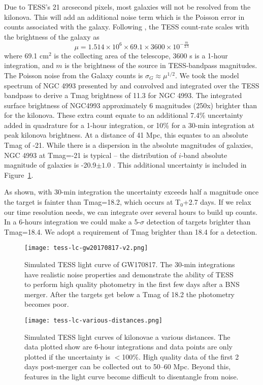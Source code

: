 \documentclass[modern]{aastex61}
\begin{document}
Due to TESS's 21 arcsecond pixels, most galaxies will not be resolved from the kilonova. This will add an additional noise term which is the Poisson error in counts associated with the galaxy. Following \citet{Bouma2017}, the TESS count-rate scales with the brightness of the galaxy as
\begin{equation}
\mu = 1.514\times10^6 \times 69.1 \times 3600 \times 10^{- \frac{m}{2.5}}
\end{equation}
where 69.1 cm$^2$ is the collecting area of the telescope, 3600 s is a 1-hour integration, and $m$ is the brightness of the source in TESS-bandpass magnitudes. The Poisson noise from the Galaxy counts is $\sigma_G\approx\mu^{1/2}$. We took the model spectrum of NGC 4993 presented by \citet{Troja2017} and convolved and integrated over the TESS bandpass to derive a Tmag brightness of 11.3 for NGC 4993. The integrated surface brightness of NGC4993 approximately 6 magnitudes (250x) brighter than for the kilonova. These extra count equate to an additional 7.4\% uncertainty added in quadrature for a 1-hour integration, or 10\% for a 30-min integration at peak kilonova brightness. At a distance of 41 Mpc, this equates to an absolute Tmag of -21. While there is a dispersion in the absolute magnitudes of galaxies, NGC 4993 at Tmag=-21 is typical -- the distribution of $i$-band absolute magnitude of galaxies is -20.9$\pm1.0$ \citep{Blanton2003}. This additional uncertainty is included in Figure~\ref{fig:tesslc}.

As shown, with 30-min integration the uncertainty exceeds half a magnitude once the target is fainter than Tmag=18.2, which occurs at T$_0$+2.7 days. If we relax our time resolution needs, we can integrate over several hours to build up counts. In a 6-hours integration we could make a 5-$\sigma$ detection of targets brighter than Tmag=18.4. We adopt a requirement of Tmag brighter than 18.4 for a detection.

\begin{figure}
\centering
\texttt{[image: tess-lc-gw20170817-v2.png]}
\caption{Simulated TESS light curve of GW170817. The 30-min integrations have realistic noise properties and demonstrate the ability of TESS to perform high quality photometry in the first few days after a BNS merger. After the targets get below a Tmag of 18.2 the photometry becomes poor.}
\label{fig:tesslc}
\end{figure}

\begin{figure}
\centering
\texttt{[image: tess-lc-various-distances.png]}
\caption{Simulated TESS light curves of kilonovae a various distances. The data plotted show are 6-hour integrations and data points are only plotted if the uncertainty is $<$100\%. High quality data of the first 2 days post-merger can be collected out to 50--60 Mpc. Beyond this, features in the light curve become difficult to disentangle from noise.}
\label{fig:tesslc-distances}
\end{figure}
\end{document}
